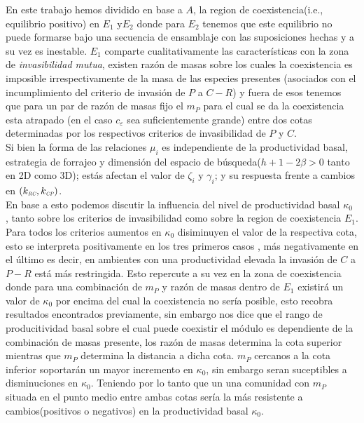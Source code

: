 En este trabajo hemos dividido en base a $A$, la region de coexistencia(i.e., equilibrio positivo) en $E_1$ y$E_2$ donde para $E_2$ tenemos que este equilibrio no puede formarse bajo una secuencia de ensamblaje con las suposiciones hechas y a su vez es inestable. $E_1$ comparte cualitativamente las caracter\'isticas con la zona de \emph{invasibilidad mutua}, existen raz\'on de masas sobre los cuales la coexistencia es imposible irrespectivamente de la masa de las especies presentes (asociados con el incumplimiento del criterio de invasi\'on de $P$ a $C-R$) y fuera de esos tenemos que para un par de raz\'on de masas fijo el $m_P$ para el cual se da la coexistencia esta atrapado (en el caso $c_\varepsilon$ sea suficientemente grande) entre dos cotas determinadas por los respectivos criterios de invasibilidad de $P$ y $C$. \\
Si bien la forma de las relaciones $\mu_i$ es independiente de la productividad basal, estrategia de forrajeo y dimensi\'on del espacio de b\'usqueda($h +1 - 2\beta >0$ tanto en 2D como 3D); est\'as afectan el valor de $\zeta_i$ y $\gamma_i$; y su respuesta frente a cambios en $(k_{\textit{\tiny RC}},k_{\textit{\tiny CP}})$.\\
En base a esto podemos discutir la influencia del nivel de productividad basal $\kappa_0$ , tanto sobre los criterios de invasibilidad como sobre la region de coexistencia $E_1$. Para todos los criterios aumentos en $\kappa_0$ disiminuyen el valor de la respectiva cota, esto se interpreta positivamente en los tres primeros casos , m\'as negativamente en el \'ultimo es decir, en ambientes con una productividad elevada la invasi\'on de $C$ a $P-R$ est\'a m\'as restringida. Esto repercute a su vez en la zona de coexistencia donde para una combinaci\'on de $m_P$ y raz\'on de masas dentro de $E_1$ existir\'a un valor de $\kappa_0$ por encima del cual la coexistencia no ser\'ia posible, esto recobra resultados encontrados previamente\citep{holt1997theoretical}, sin embargo nos dice que el rango de producitividad basal sobre el cual puede coexistir el m\'odulo es dependiente de la combinaci\'on de masas presente, los raz\'on de masas determina la cota superior mientras que $m_P$ determina la distancia a dicha cota. $m_P$ cercanos a la cota inferior soportar\'an un mayor incremento en $\kappa_0$, sin embargo seran suceptibles a disminuciones en $\kappa_0$. Teniendo por lo tanto que un una comunidad con $m_P$ situada en el punto medio entre ambas cotas ser\'ia la m\'as resistente a cambios(positivos o negativos) en la productividad basal $\kappa_0$.\\

